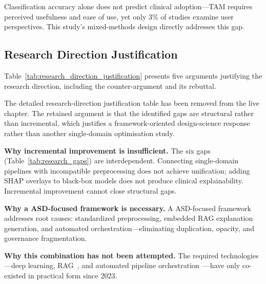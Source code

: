 
Classification accuracy alone does not predict clinical adoption---TAM requires perceived usefulness and ease of use, yet only 3\% of studies examine user perspectives. This study's mixed-methods design directly addresses this gap.

\subsection{Research Direction Justification}

Table~\ref{tab:research_direction_justification} presents five arguments justifying the research direction, including the counter-argument and its rebuttal.

\noindent The detailed research-direction justification table has been removed from the live chapter. The retained argument is that the identified gaps are structural rather than incremental, which justifies a framework-oriented design-science response rather than another single-domain optimisation study.

\iffalse %
\textbf{Why incremental improvement is insufficient.} The six gaps (Table~\ref{tab:research_gaps}) are interdependent. Connecting single-domain pipelines with incompatible preprocessing does not achieve unification; adding SHAP overlays to black-box models does not produce clinical explainability. Incremental improvement cannot close structural gaps.

\textbf{Why a ASD-focused framework is necessary.} A ASD-focused framework addresses root causes: standardized preprocessing, embedded RAG explanation generation, and automated orchestration---eliminating duplication, opacity, and governance fragmentation.

\textbf{Why this combination has not been attempted.} The required technologies---deep learning, RAG~\cite{lewis2020rag}, and automated pipeline orchestration~\cite{wang2024agentai}---have only co-existed in practical form since 2023.

